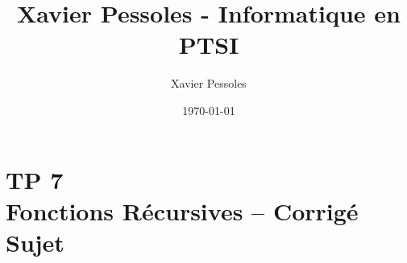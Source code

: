\documentclass[
	fontsize=10pt, %
	twoside=true, %
]{kaobook}
\newcommand{\repRel}{../../../..}
\newcommand{\repStyle}{\repRel/Style}
\begin{document}

\titlehead{Xavier Pessoles - Informatique en PTSI}
\title[Xavier Pessoles - Informatique en PTSI]{Xavier Pessoles - Informatique en PTSI}
\author[XP]{Xavier Pessoles}
\date{\today}


\begingroup %
\endgroup

%
\mainmatter %
%
%
%
%


\setcounter{margintocdepth}{\sectiontocdepth}
\marginlayout
\graphicspath{{\repStyle/png}}

\pagestyle{xp.scrheadings}


%



\newcommand{\repExo}{}
\newcommand{\nomExo}{}

\livrettrue %
\livretfalse
\colletrue


\renewcommand{\repExo}{\repRel/Informatique/Exercices/S1_06_Gloutons/}
\renewcommand{\nomExo}{07_Glouton_2023}
\graphicspath{{\repStyle/png}{\repExo\nomExo/images}{images}}


\chapter*{TP 7 \\ 
Fonctions Récursives -- \ifprof Corrigé \else Sujet \fi}
\end{document}
